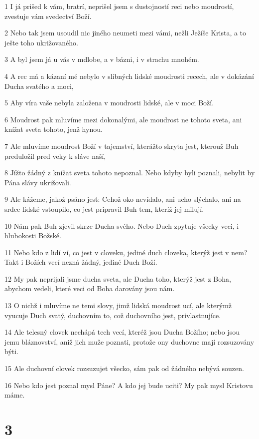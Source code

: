 \par 1 I já prišed k vám, bratrí, neprišel jsem s dustojností reci nebo moudrostí, zvestuje vám svedectví Boží.
\par 2 Nebo tak jsem usoudil nic jiného neumeti mezi vámi, nežli Ježíše Krista, a to ješte toho ukrižovaného.
\par 3 A byl jsem já u vás v mdlobe, a v bázni, i v strachu mnohém.
\par 4 A rec má a kázaní mé nebylo v slibných lidské moudrosti recech, ale v dokázání Ducha svatého a moci,
\par 5 Aby víra vaše nebyla založena v moudrosti lidské, ale v moci Boží.
\par 6 Moudrost pak mluvíme mezi dokonalými, ale moudrost ne tohoto sveta, ani knížat sveta tohoto, jenž hynou.
\par 7 Ale mluvíme moudrost Boží v tajemství, kterážto skryta jest, kterouž Buh preduložil pred veky k sláve naší,
\par 8 Jížto žádný z knížat sveta tohoto nepoznal. Nebo kdyby byli poznali, nebylit by Pána slávy ukrižovali.
\par 9 Ale kážeme, jakož psáno jest: Cehož oko nevídalo, ani ucho slýchalo, ani na srdce lidské vstoupilo, co jest pripravil Buh tem, kteríž jej milují.
\par 10 Nám pak Buh zjevil skrze Ducha svého. Nebo Duch zpytuje všecky veci, i hlubokosti Božské.
\par 11 Nebo kdo z lidí ví, co jest v cloveku, jediné duch cloveka, kterýž jest v nem? Takt i Božích vecí nezná žádný, jediné Duch Boží.
\par 12 My pak neprijali jsme ducha sveta, ale Ducha toho, kterýž jest z Boha, abychom vedeli, které veci od Boha darovány jsou nám.
\par 13 O nichž i mluvíme ne temi slovy, jimž lidská moudrost ucí, ale kterýmž vyucuje Duch svatý, duchovním to, což duchovního jest, privlastnujíce.
\par 14 Ale telesný clovek nechápá tech vecí, kteréž jsou Ducha Božího; nebo jsou jemu bláznovství, aniž jich muže poznati, protože ony duchovne mají rozsuzovány býti.
\par 15 Ale duchovní clovek rozsuzujet všecko, sám pak od žádného nebývá souzen.
\par 16 Nebo kdo jest poznal mysl Páne? A kdo jej bude uciti? My pak mysl Kristovu máme.

\chapter{3}


